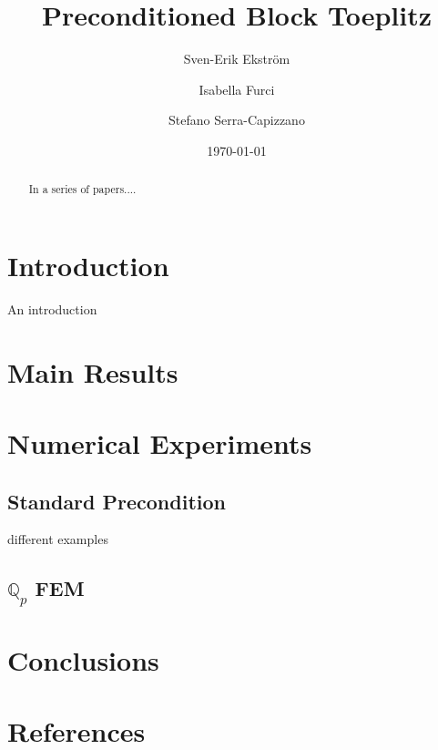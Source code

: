 \documentclass[10pt]{article}
\begin{document}
\title{Preconditioned Block Toeplitz}
\author{Sven-Erik Ekstr\"om         \and
        Isabella Furci \and
        Stefano Serra-Capizzano %
}\date{\today}
\maketitle
\begin{abstract}
In a series of papers....
\end{abstract}
\section{Introduction}
An introduction
\section{Main Results}
\section{Numerical Experiments}
\subsection{Standard Precondition}
 different examples
\subsection{$\mathbb{Q}_p$ FEM}
\section{Conclusions}
\section{References}
\end{document}
